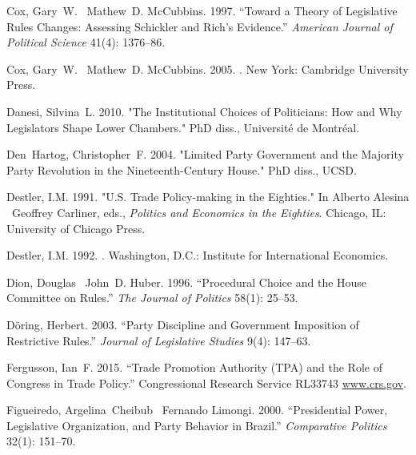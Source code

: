 \documentclass[letter,12pt]{article}
\begin{document}
\begin{thebibliography}{xx}
Cox, Gary~W. \harvardand\ Mathew~D. McCubbins. 1997.
\newblock ``Toward a Theory of Legislative Rules Changes: Assessing {S}chickler
  and {R}ich's Evidence.'' {\em American Journal of Political Science}
  41(4): 1376--86.

Cox, Gary~W. \harvardand\ Mathew~D. McCubbins. 2005.
.
\newblock New York:  Cambridge University Press.

Danesi, Silvina~L. 2010.
\newblock "The Institutional Choices of Politicians: How and Why Legislators
  Shape Lower Chambers." PhD diss., Universit\'e de Montr\'eal.

Den~Hartog, Christopher~F. 2004.
\newblock "Limited Party Government and the Majority Party Revolution in the
  Nineteenth-Century {H}ouse." PhD diss., UCSD.

Destler, I.M. 1991.
\newblock "U.S. Trade Policy-making in the Eighties."  In Alberto Alesina \harvardand\ Geoffrey Carliner, eds.,  {\em Politics and
  Economics in the Eighties}. 
\newblock Chicago, IL:  University of Chicago Press.

Destler, I.M. 1992.
.
\newblock Washington, D.C.:  Institute for International Economics.

Dion, Douglas \harvardand\ John~D. Huber. 1996.
\newblock ``Procedural Choice and the {H}ouse Committee on Rules.'' {\em The
  Journal of Politics} 58(1): 25--53.

D{\"o}ring, Herbert. 2003.
\newblock ``Party Discipline and Government Imposition of Restrictive Rules.''
  {\em Journal of Legislative Studies} 9(4): 147--63.

Fergusson, Ian~F. 2015.
\newblock ``Trade Promotion Authority (TPA) and the Role of Congress in Trade
  Policy.'' Congressional Research Service RL33743 \url{www.crs.gov}.

Figueiredo, Argelina~Cheibub \harvardand\ Fernando Limongi. 2000.
\newblock ``Presidential Power, Legislative Organization, and Party Behavior in
  Brazil.'' {\em Comparative Politics} 32(1): 151--70.


\end{thebibliography}
\end{document}
